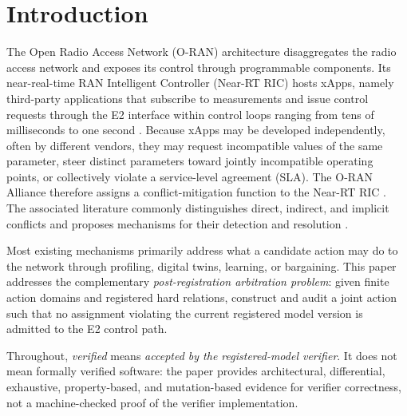 \documentclass[pdflatex,sn-mathphys-num,iicol,oneside]{sn-jnl}
\begin{document}

\maketitle

\section{Introduction}
\label{sec:introduction}

The Open Radio Access Network (O-RAN) architecture disaggregates the
radio access network and exposes its control through programmable
components. Its near-real-time RAN Intelligent Controller (Near-RT
RIC) hosts xApps, namely third-party applications that subscribe to
measurements and issue control requests through the E2 interface
within control loops ranging from tens of milliseconds to one second
\cite{polese2023oran}. Because xApps may be developed independently,
often by different vendors, they may request incompatible values of
the same parameter, steer distinct parameters toward jointly
incompatible operating points, or collectively violate a
service-level agreement (SLA). The O-RAN Alliance therefore assigns a
conflict-mitigation function to the Near-RT RIC
\cite{oran2024conflict}. The associated literature commonly
distinguishes direct, indirect, and implicit conflicts and proposes
mechanisms for their detection and resolution
\cite{adamczyk2023conflict,wadud2024qacm}.

Most existing mechanisms primarily address what a candidate action
may do to the network through profiling, digital twins, learning, or
bargaining. This paper addresses the complementary
\emph{post-registration arbitration problem}: given finite action
domains and registered hard relations, construct and audit a joint
action such that no assignment violating the current registered model
version is admitted to the E2 control path.

Throughout, \emph{verified} means \emph{accepted by the registered-model
verifier}. It does not mean formally verified software: the paper
provides architectural, differential, exhaustive, property-based, and
mutation-based evidence for verifier correctness, not a machine-checked
proof of the verifier implementation.
\end{document}
